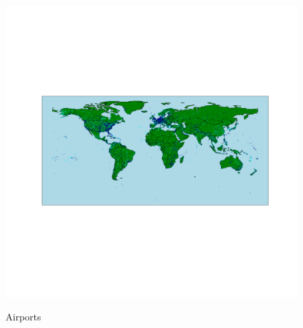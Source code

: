 \begin{figure}[H]
  \centering
  \caption{Airports}
    \includegraphics[width=1. \textwidth]{Exam/Airports_WorldMap}
  \label{fig:airports}
\end{figure}
